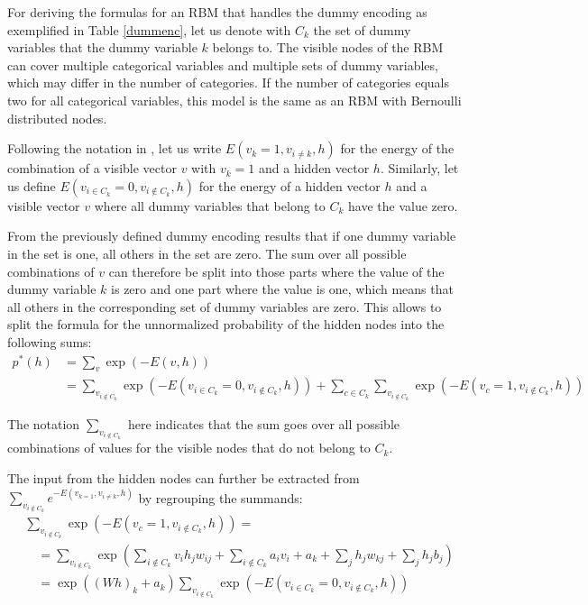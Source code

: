\documentclass[12pt]{article}
\begin{document}
For deriving the formulas for an RBM that handles the dummy encoding as exemplified in Table \ref{dummenc}, let us denote with $C_k$ the set of dummy variables that the dummy variable $k$ belongs to.
The visible nodes of the RBM can cover multiple categorical variables and multiple sets of dummy variables, which may differ in the number of categories.
If the number of categories equals two for all categorical variables, this model is the same as an RBM with Bernoulli distributed nodes.

Following the notation in \cite{krizhevsky2009tinyimagesthesis}, let us write $E(v_k = 1, v_{i \neq k}, h)$ for the energy of the combination of a visible vector $v$ with $v_k = 1$ and a hidden vector $h$. Similarly, let us define $E(v_{i \in C_k} = 0, v_{i \notin C_k}, h)$ for the energy of a hidden vector $h$ and a visible vector $v$ where all dummy variables that belong to $C_k$ have the value zero.

From the previously defined dummy encoding results that if one dummy variable in the set is one, all others in the set are zero.
The sum over all possible combinations of $v$ can therefore be split into those parts where the value of the dummy variable $k$ is zero and one part where the value is one, which means that all others in the corresponding set of dummy variables are zero.
This allows to split the formula for the unnormalized probability of the hidden nodes into the following sums:
\begin{align}
p^*(h) &= \sum_v  \exp (-E(v,h)) \nonumber \\
&= \sum_{v_{i \notin C_k}} \exp (-E(v_{i \in C_k} = 0, v_{i \notin C_k}, h)) + \sum_{c \in C_k} \sum_{v_{i \notin C_k}} \exp ( - E(v_c = 1, v_{i \notin C_k},  h))
\end{align}

The notation $\sum_{v_{i \notin C_k}}$ here indicates that the sum goes over all possible combinations of values for the visible nodes that do not belong to $C_k$.

The input from the hidden nodes can further be extracted from $ \sum_{v_{i \notin C_k}} e^{-E(v_{k=1}, v_{i \neq k}, h)}$ by regrouping the summands:
\begin{align}
&\sum_{v_{i \notin C_k}} \exp ( - E(v_c = 1, v_{i \notin C_k},  h)) = \nonumber \\
&\quad = \sum_{v_{i \notin C_k}} \exp \left( \sum_{i \notin C_k} v_i h_j w_{ij} + \sum_{i \notin C_k} a_i v_i + a_k  + \sum_j h_j w_{kj} +\sum_j h_j b_j \right) \nonumber \\
&\quad = \exp \left( (Wh)_k + a_k \right) \sum_{v_{i \notin C_k}} \exp \left(-E(v_{i \in C_k} = 0, v_{i \notin C_k}, h) \right)
\label{eqn:sumvksoftmax}
\end{align}
\end{document}
